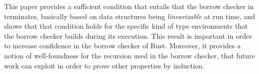 This paper provides a sufficient condition that entails that the borrow checker
in~\cite{Pearce21} terminates, basically based on data structures being \emph{linearizable} at run time,
and shows that that condition holds for the specific kind of type
environments that the borrow checker builds during its execution.
This result is important in order to increase confidence in the borrow checker of Rust.
Moreover, it provides a notion of well-foundness for the recursion used in the borrow checker,
that future work can exploit in order to prove other properties by induction.
